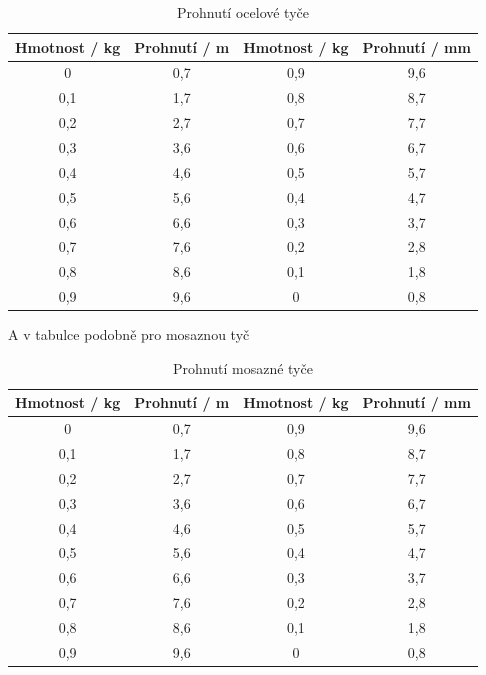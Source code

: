 \begin{table}[h]
\centering
\begin{tabular}{|c|c|c|c|}
\hline
Hmotnost / kg & Prohnutí / m & Hmotnost / kg & Prohnutí / mm \\ \hline
0             & 0,7          & 0,9           & 9,6          \\ \hline
0,1           & 1,7          & 0,8           & 8,7          \\ \hline
0,2           & 2,7          & 0,7           & 7,7          \\ \hline
0,3           & 3,6          & 0,6           & 6,7          \\ \hline
0,4           & 4,6          & 0,5           & 5,7          \\ \hline
0,5           & 5,6          & 0,4           & 4,7          \\ \hline
0,6           & 6,6          & 0,3           & 3,7          \\ \hline
0,7           & 7,6          & 0,2           & 2,8          \\ \hline
0,8           & 8,6          & 0,1           & 1,8          \\ \hline
0,9           & 9,6          & 0             & 0,8          \\ \hline
\end{tabular}
\caption{Prohnutí ocelové tyče}
\label{tab:ocelova-tyc}
\end{table}

A v tabulce podobně pro mosaznou tyč

\begin{table}[h]
\centering
\begin{tabular}{|c|c|c|c|}
\hline
Hmotnost / kg & Prohnutí / m & Hmotnost / kg & Prohnutí / mm \\ \hline
0             & 0,7          & 0,9           & 9,6          \\ \hline
0,1           & 1,7          & 0,8           & 8,7          \\ \hline
0,2           & 2,7          & 0,7           & 7,7          \\ \hline
0,3           & 3,6          & 0,6           & 6,7          \\ \hline
0,4           & 4,6          & 0,5           & 5,7          \\ \hline
0,5           & 5,6          & 0,4           & 4,7          \\ \hline
0,6           & 6,6          & 0,3           & 3,7          \\ \hline
0,7           & 7,6          & 0,2           & 2,8          \\ \hline
0,8           & 8,6          & 0,1           & 1,8          \\ \hline
0,9           & 9,6          & 0             & 0,8          \\ \hline
\end{tabular}
\caption{Prohnutí mosazné tyče}
\label{tab:mosazna-tyc}
\end{table}



